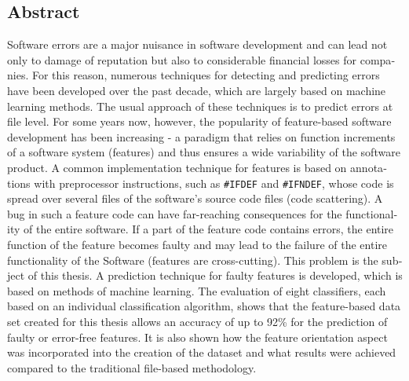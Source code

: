 \begin{otherlanguage}{english}
    \section*{Abstract}
    
Software errors are a major nuisance in software development and can lead not only to damage of reputation but also to considerable financial losses for companies. For this reason, numerous techniques for detecting and predicting errors have been developed over the past decade, which are largely based on machine learning methods. The usual approach of these techniques is to predict errors at file level. For some years now, however, the popularity of feature-based software development has been increasing - a paradigm that relies on function increments of a software system (features) and thus ensures a wide variability of the software product. A common implementation technique for features is based on annotations with preprocessor instructions, such as \texttt{\#IFDEF} and \texttt{\#IFNDEF}, whose code is spread over several files of the software's source code files (\glqq code scattering\grqq). A bug in such a feature code can have far-reaching consequences for the functionality of the entire software. If a part of the feature code contains errors, the entire function of the feature becomes faulty and may lead to the failure of the entire functionality of the Software (features are \glqq cross-cutting\grqq{}). This problem is the subject of this thesis. A prediction technique for faulty features is developed, which is based on methods of machine learning. The evaluation of eight classifiers, each based on an individual classification algorithm, shows that the feature-based data set created for this thesis allows an accuracy of up to 92\% for the prediction of faulty or error-free features. It is also shown how the feature orientation aspect was incorporated into the creation of the dataset and what results were achieved compared to the traditional file-based methodology.

\end{otherlanguage}
\cleardoublepage
